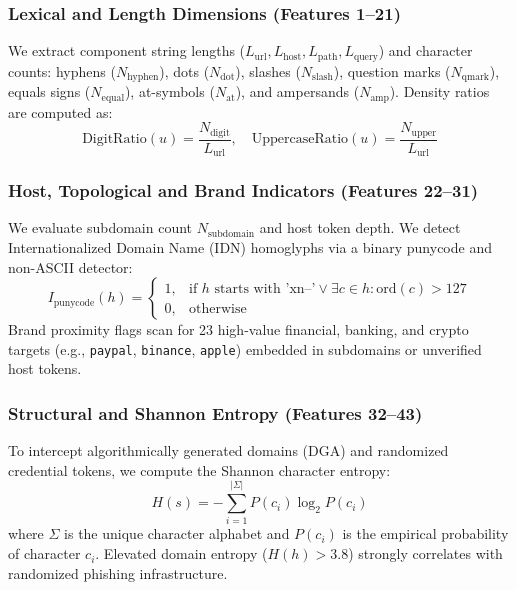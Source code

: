\documentclass[conference]{IEEEtran}
\begin{document}
\subsubsection{Lexical and Length Dimensions (Features 1--21)}
We extract component string lengths ($L_{\text{url}}, L_{\text{host}}, L_{\text{path}}, L_{\text{query}}$) and character counts: hyphens ($N_{\text{hyphen}}$), dots ($N_{\text{dot}}$), slashes ($N_{\text{slash}}$), question marks ($N_{\text{qmark}}$), equals signs ($N_{\text{equal}}$), at-symbols ($N_{\text{at}}$), and ampersands ($N_{\text{amp}}$). Density ratios are computed as:
\begin{equation}
\text{DigitRatio}(u) = \frac{N_{\text{digit}}}{L_{\text{url}}}, \quad \text{UppercaseRatio}(u) = \frac{N_{\text{upper}}}{L_{\text{url}}}
\end{equation}

\subsubsection{Host, Topological and Brand Indicators (Features 22--31)}
We evaluate subdomain count $N_{\text{subdomain}}$ and host token depth. We detect Internationalized Domain Name (IDN) homoglyphs via a binary punycode and non-ASCII detector:
\begin{equation}
I_{\text{punycode}}(h) = \begin{cases} 1, & \text{if } h \text{ starts with 'xn--'} \lor \exists c \in h : \text{ord}(c) > 127 \\ 0, & \text{otherwise} \end{cases}
\end{equation}
Brand proximity flags scan for 23 high-value financial, banking, and crypto targets (e.g., \texttt{paypal}, \texttt{binance}, \texttt{apple}) embedded in subdomains or unverified host tokens.

\subsubsection{Structural and Shannon Entropy (Features 32--43)}
To intercept algorithmically generated domains (DGA) and randomized credential tokens, we compute the Shannon character entropy:
\begin{equation}
H(s) = -\sum_{i=1}^{|\Sigma|} P(c_i) \log_2 P(c_i)
\end{equation}
where $\Sigma$ is the unique character alphabet and $P(c_i)$ is the empirical probability of character $c_i$. Elevated domain entropy ($H(h) > 3.8$) strongly correlates with randomized phishing infrastructure.
\end{document}
